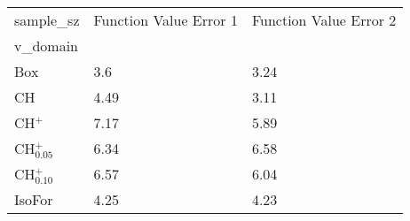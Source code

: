 \begin{tabular}{lll}
\toprule
sample_sz & Function Value Error 1 & Function Value Error 2 \\
v_domain &  &  \\
\midrule
Box & 3.6 & 3.24 \\
CH & 4.49 & 3.11 \\
CH$^+$ & 7.17 & 5.89 \\
CH$^+_{0.05}$ & 6.34 & 6.58 \\
CH$^+_{0.10}$ & 6.57 & 6.04 \\
IsoFor & 4.25 & 4.23 \\
\bottomrule
\end{tabular}

